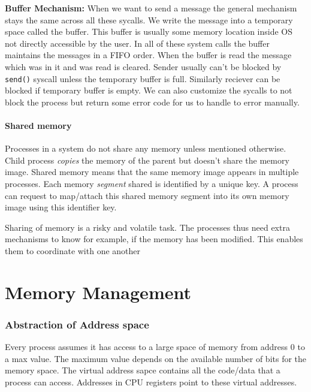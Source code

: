 \documentclass[12pt]{article}
\newcommand{\tbox}[1]{\noindent\fbox{\parbox{\textwidth}{#1}}}
\begin{document}
\textbf{Buffer Mechanism:}  
When we want to send a message the general mechanism stays the same across all these sycalls. We write the message into a temporary space called the buffer. This buffer is usually some memory location
inside OS not directly accessible by the user.
In all of these system calls the buffer maintains the messages in a FIFO order. When the buffer is read the message which was in it and was read is cleared. Sender 
usually can't be blocked by \texttt{send()} syscall unless the temporary buffer is full. Similarly reciever can be blocked if temporary buffer is empty. We can also customize the sycalls to not block the process
but return some error code for us to handle to error manually.

\subsection{Shared memory}
Processes in a system do not share any memory unless mentioned otherwise. Child process \textit{copies} the memory of the parent but doesn't share the memory image.
Shared memory means that the same memory image appears in multiple processes. Each memory \textit{segment} shared is identified by a unique key. A process can request to map/attach this shared 
memory segment into its own memory image using this identifier key. 

Sharing of memory is a risky and volatile task. The processes thus need extra mechanisms to know for example, if the memory has been modified. This enables them to coordinate with one another

\newpage
\noindent\tbox{
    \begin{center}
    \textbf{\Huge Lecture 12}
    \end{center}
}
\part{Memory Management}
\section*{Abstraction of Address space}
Every process assumes it has access to a large space of memory from address 0 to a max value. The maximum value depends on the available number of bits for the memory space.
The virtual address sapce contains all the code/data that a process can access. Addresses in CPU registers point to these virtual addresses.
\end{document}
